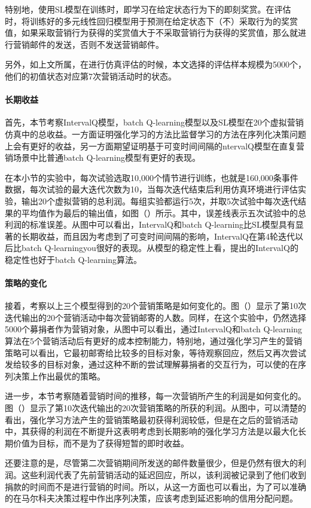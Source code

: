 特别地，使用SL模型在训练时，即学习在给定状态行为下的即刻奖赏。在评估时，将训练好的多元线性回归模型用于预测在给定状态下（不）采取行为的奖赏值，如果采取营销行为获得的奖赏值大于不采取营销行为获得的奖赏值，那么就进行营销邮件的发送，否则不发送营销邮件。

另外，如上文所属，在进行仿真评估的时候，本文选择的评估样本规模为5000个，他们的初值状态对应第7次营销活动时的状态。

\paragraph{长期收益}
首先，本节考察IntervalQ模型，batch Q-learning模型以及SL模型在20个虚拟营销仿真中的总收益。一方面证明强化学习的方法比监督学习的方法在序列化决策问题上会有更好的收益，另一方面期望证明基于可变时间间隔的ntervalQ模型在直复营销场景中比普通batch Q-learning模型有更好的表现。

在本小节的实验中，每次试验选取10,000个情节进行训练，也就是160,000条事件数据，每次试验的最大迭代次数为10，当每次迭代结束后利用仿真环境进行评估实验，输出20个虚拟营销的总利润。每组实验都运行5次，并取5次试验中每次迭代结果的平均值作为最后的输出值，如图（）所示。其中，误差线表示五次试验中的总利润的标准误差。从图中可以看出，IntervalQ和batch Q-learning比SL模型具有显著的长期收益，而且因为考虑到了可变时间间隔的影响，IntervalQ在第4轮迭代以后比batch Q-learningyou很好的表现。从模型的稳定性上看，提出的IntervalQ的稳定性也好于batch Q-learning算法。


\paragraph{策略的变化}
接着，考察以上三个模型得到的20个营销策略是如何变化的。图（）显示了第10次迭代输出的20个营销活动中每次营销邮寄的人数。同样，在这个实验中，仍然选择5000个募捐者作为营销对象，从图中可以看出，通过IntervalQ和batch Q-learning算法在5个营销活动后有更好的成本控制能力，特别地，通过强化学习产生的营销策略可以看出，它最初邮寄给比较多的目标对象，等待观察回应，然后又再次尝试发给较多的目标对象，通过这种不断的尝试理解募捐者的交互行为，可以使的在序列决策上作出最优的策略。

进一步，本节考察随着营销时间的推移，每一次营销所产生的利润是如何变化的。图（）显示了第10次迭代输出的20次营销策略的所获的利润。从图中，可以清楚的看出，强化学习方法产生的营销策略最初获得利润较低，但是在之后的营销活动中，其获得的利润在不断提升这表明考虑到长期影响的强化学习方法是以最大化长期价值为目标，而不是为了获得短暂的即时收益。

还要注意的是，尽管第二次营销期间所发送的邮件数量很少，但是仍然有很大的利润。这些利润代表了先前营销活动的延迟回应，所以，该利润被记录到了他们收到捐款的时间而不是进行营销的时间。所以，从这一方面也可以看出，为了可以准确的在马尔科夫决策过程中作出序列决策，应该考虑到延迟影响的信用分配问题。

